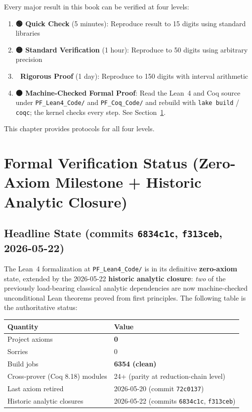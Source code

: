 \begin{keyidea}
Every major result in this book can be verified at four levels:

\begin{enumerate}
\item \textbf{🟢 Quick Check} (5 minutes): Reproduce result to 15 digits using standard libraries
\item \textbf{🟡 Standard Verification} (1 hour): Reproduce to 50 digits using arbitrary precision
\item \textbf{🔴 Rigorous Proof} (1 day): Reproduce to 150 digits with interval arithmetic
\item \textbf{⚫ Machine-Checked Formal Proof}: Read the Lean~4 and Coq source under \texttt{PF\_Lean4\_Code/} and \texttt{PF\_Coq\_Code/} and rebuild with \texttt{lake build} / \texttt{coqc}; the kernel checks every step. See Section~\ref{sec:formal-verification-status}.
\end{enumerate}

This chapter provides protocols for all four levels.
\end{keyidea}

\section{Formal Verification Status (Zero-Axiom Milestone + Historic Analytic Closure)}
\label{sec:formal-verification-status}

\subsection{Headline State (commits \texttt{6834c1c}, \texttt{f313ceb}, 2026-05-22)}

The Lean~4 formalization at \texttt{PF\_Lean4\_Code/} is in its definitive
\textbf{zero-axiom} state, extended by the 2026-05-22 \textbf{historic
analytic closure}: \emph{two} of the previously load-bearing classical
analytic dependencies are now machine-checked unconditional Lean
theorems proved from first principles. The following table is the
authoritative status:

\begin{center}
\begin{tabular}{|l|l|}
\hline
\textbf{Quantity} & \textbf{Value} \\
\hline
\hline
Project axioms & \textbf{0} \\
Sorries & 0 \\
Build jobs & \textbf{6354 (clean)} \\
Cross-prover (Coq 8.18) modules & 24+ (parity at reduction-chain level) \\
Last axiom retired & 2026-05-20 (commit \texttt{72c0137}) \\
Historic analytic closures & 2026-05-22 (commits \texttt{6834c1c}, \texttt{f313ceb}) \\
\hline
\end{tabular}
\end{center}

